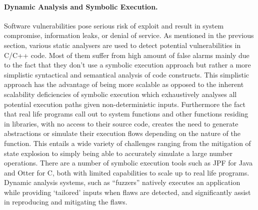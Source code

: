 \documentclass[a4paper,11pt]{article}
\newcommand{\project}[1]{\textbf{#1}\xspace}
\newcommand{\SECURITY}{\project{Elysian}}
\newcommand{\TheProject}{\SECURITY}
\begin{document}
\paragraph{Dynamic Analysis and Symbolic Execution.}
Software vulnerabilities pose serious risk of exploit and result in system compromise, information leaks, or denial of service. As mentioned in the previous section, various static analysers are used to detect potential vulnerabilities in C/C++ code. Most of them suffer from high amount of false alarms mainly due to the fact that they don’t use a symbolic execution approach but rather a more simplistic syntactical and semantical analysis of code constructs. This simplistic approach has the advantage of being more scalable as opposed to the inherent scalability deficiencies of symbolic execution which exhaustively analyses all potential execution paths given non-deterministic inputs. Furthermore the fact that real life programs call out to system functions and other functions residing in libraries, with no access to their source code, creates the need to generate abstractions or simulate their execution flows depending on the nature of the function. This entails a wide variety of challenges ranging from the mitigation of state explosion to simply being able to accurately simulate a large number operations. There are a number of symbolic execution tools such as JPF for Java and Otter for C, both with limited capabilities to scale up to real life programs.
%
Dynamic analysis systems, such as “fuzzers” natively executes an application while providing ‘tailored’ inputs when flaws are detected, and significantly assist in reproducing and mitigating the flaws. 

\end{document}
